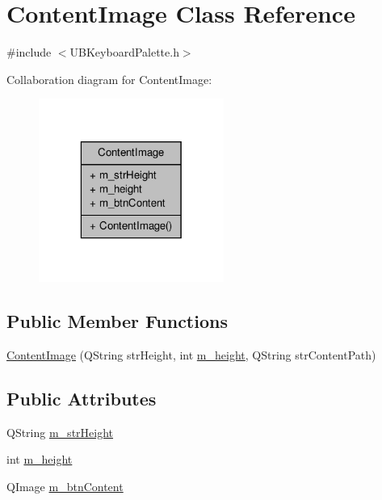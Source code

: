 \hypertarget{class_content_image}{\section{Content\-Image Class Reference}
\label{d6/d91/class_content_image}
}


{\ttfamily \#include $<$U\-B\-Keyboard\-Palette.\-h$>$}



Collaboration diagram for Content\-Image\-:
\nopagebreak
\begin{figure}[H]
\begin{center}
\leavevmode
\includegraphics[width=172pt]{d1/d8b/class_content_image__coll__graph}
\end{center}
\end{figure}
\subsection*{Public Member Functions}
\begin{DoxyCompactItemize}
\item 
\hyperlink{class_content_image_aa873cbf7c839dc9f28aada055ae772a3}{Content\-Image} (Q\-String str\-Height, int \hyperlink{class_content_image_a4c9b385be7cf07aae5cb3db63ad2fd07}{m\-\_\-height}, Q\-String str\-Content\-Path)
\end{DoxyCompactItemize}
\subsection*{Public Attributes}
\begin{DoxyCompactItemize}
\item 
Q\-String \hyperlink{class_content_image_a4b6af2cc0e1d7cb87f0f3976b2cd2828}{m\-\_\-str\-Height}
\item 
int \hyperlink{class_content_image_a4c9b385be7cf07aae5cb3db63ad2fd07}{m\-\_\-height}
\item 
Q\-Image \hyperlink{class_content_image_ac909e18dddf912ccaa795469718ca55d}{m\-\_\-btn\-Content}
\end{DoxyCompactItemize}


